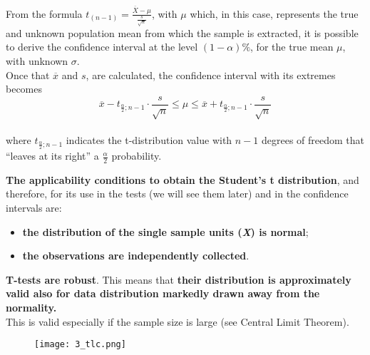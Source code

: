 
\begin{frame}
  \vspace*{.25cm}
  From the formula $t_{(n-1)}=\frac{\overline{X}-\mu}{\frac{s}{\sqrt{n}}}$, with $\mu$ which, in this case, represents the true and unknown population mean from which the sample is extracted, it is possible to derive the confidence interval at the level  $(1-\alpha)\%$, for the true mean $\mu$, with unknown $\sigma$.\\
  \vspace*{.5cm}
  Once that $\overline{x}$ and $s$, are calculated, the confidence interval with its extremes becomes\\
  $$ \overline{x}- t_{\frac{\alpha}{2};n-1}\cdot \frac{s}{\sqrt{n}} \leq \mu \leq \overline{x}+ t_{\frac{\alpha}{2};n-1}\cdot \frac{s}{\sqrt{n}} $$\\
  where $t_{\frac{\alpha}{2};n-1}$ indicates the t-distribution value with  $ n-1 $ degrees of freedom that ``leaves at its right'' a $\frac{\alpha}{2}$ probability.
\end{frame}


\begin{frame}
  \vspace*{.25cm}
  \textbf{The applicability conditions to obtain the Student's t distribution}, and therefore, for its use in the tests (we will see them later) and in the confidence intervals are:
  \begin{itemize}
    \item \textbf{the distribution of the single sample units (\textit{X}) is normal};
    \item \textbf{the observations are independently collected}.
  \end{itemize}
  \vspace*{.5cm}
  \textbf{T-tests are robust}. This means that \textbf{their distribution is approximately valid also for data distribution markedly drawn away from the normality.}\\
  This is valid especially if the sample size is large (see Central Limit Theorem).\\
  \vspace*{.25cm}
\end{frame}

\begin{frame}
  \vspace*{-.15cm}
  \begin{figure}
    \texttt{[image: 3\_tlc.png]}
  \end{figure}
\end{frame}

